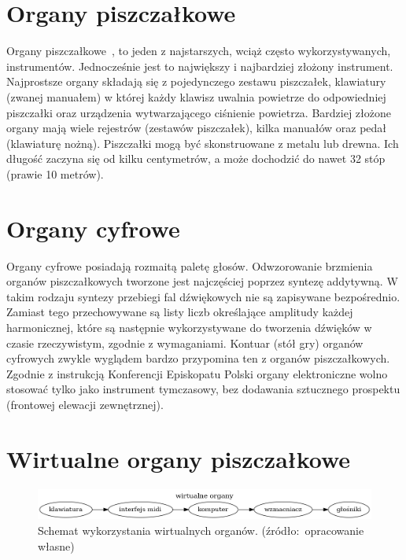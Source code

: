 \documentclass[11pt]{report}
\begin{document}
    \section{Organy piszczałkowe}
    Organy piszczałkowe~\cite{329316420170801}, to jeden z najstarszych, wciąż często wykorzystywanych, instrumentów.
    Jednocześnie jest to największy i najbardziej złożony instrument.
    Najprostsze organy składają się z pojedynczego zestawu piszczałek, klawiatury (zwanej manuałem) w której każdy klawisz uwalnia powietrze do odpowiedniej piszczałki oraz urządzenia wytwarzającego ciśnienie powietrza.
    Bardziej złożone organy mają wiele rejestrów (zestawów piszczałek), kilka manuałów oraz pedał (klawiaturę nożną).
    Piszczałki mogą być skonstruowane z metalu lub drewna.
    Ich długość zaczyna się od kilku centymetrów, a może dochodzić do nawet 32 stóp (prawie 10 metrów).


    \section{Organy cyfrowe}
    Organy cyfrowe posiadają rozmaitą paletę głosów.
    Odwzorowanie brzmienia organów piszczałkowych tworzone jest najczęściej poprzez syntezę addytywną.
    W takim rodzaju syntezy przebiegi fal dźwiękowych nie są zapisywane bezpośrednio.
    Zamiast tego przechowywane są listy liczb określające amplitudy każdej harmonicznej,
    które są następnie wykorzystywane do tworzenia dźwięków w czasie rzeczywistym, zgodnie z wymaganiami.
    Kontuar (stół gry) organów cyfrowych zwykle wyglądem bardzo przypomina ten z organów piszczałkowych.
    Zgodnie z instrukcją Konferencji Episkopatu Polski organy elektroniczne wolno stosować tylko jako instrument tymczasowy,
    bez dodawania sztucznego prospektu (frontowej elewacji zewnętrznej).


    \section{Wirtualne organy piszczałkowe}

    \begin{figure}[!htp]
        \centering
        \includegraphics[width=\linewidth]{fig/organizacja.png}
        \caption{Schemat wykorzystania wirtualnych organów. (źródło:~opracowanie własne)}
        \label{fig:schemat}
    \end{figure}
\end{document}
